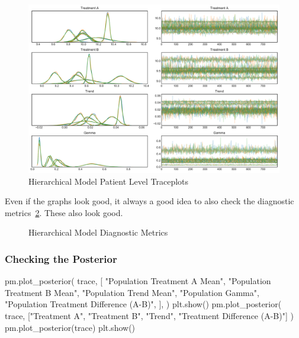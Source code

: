\documentclass[12pt,a4paper,leqno]{report}
\theoremstyle{plain}
\theoremstyle{definition}
\theoremstyle{remark}
\begin{document}
\bigskip
\begin{figure}[H]
    \caption{Hierarchical Model Patient Level Traceplots}
    \label{hierarchicalmodelpatienttraceplots}
    \bigskip
    \includegraphics[width=\textwidth,height=\textheight,keepaspectratio]{hierarchical_model_patient_level_traceplot.pdf}
\end{figure}
\bigskip

Even if the graphs look good, it always a good idea to also check the diagnostic
metrics\ \ref{hierarchicalmodeldiagnosticmeasures}. These also look good.

\bigskip
\begin{figure}[H]
    \caption{Hierarchical Model Diagnostic Metrics}
    \label{hierarchicalmodeldiagnosticmeasures}
    \bigskip
    
\end{figure}
\bigskip

\subsubsection{Checking the Posterior}

\bigskip
\begin{pyverbatim}
    pm.plot_posterior(
        trace,
        [
            "Population Treatment A Mean",
            "Population Treatment B Mean",
            "Population Trend Mean",
            "Population Gamma",
            "Population Treatment Difference (A-B)",
        ],
    )
    plt.show()
    pm.plot_posterior(
        trace, ["Treatment A", "Treatment B", "Trend", "Treatment Difference (A-B)"]
    )
    pm.plot_posterior(trace)
    plt.show()
\end{pyverbatim}
\bigskip
\end{document}
